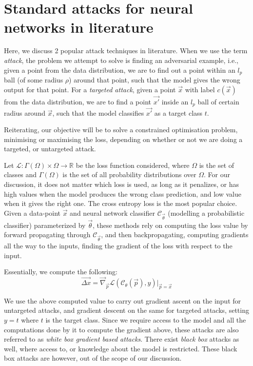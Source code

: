 \documentclass{ociamthesis}
\begin{document}
\section{Standard attacks for neural networks in literature}
\label{section:standard-attacks}

Here, we discuss 2 popular attack techniques in literature. When we use the term
\emph{attack}, the problem we attempt to solve is finding an adversarial
example, i.e., given a point from the data distribution, we are to find out a
point within an $l_p$ ball (of some radius $\rho$) around that point, such that
the model gives the wrong output for that point. For a \emph{targeted attack},
given a point $\vec{x}$ with label $c(\vec{x})$ from the data distribution, we
are to find a point $\vec{x'}$ inside an $l_p$ ball of certain radius around
$\vec{x}$, such that the model classifies $\vec{x'}$ as a target class $t$.

Reiterating, our objective will be to solve a constrained optimisation problem,
minimising or maximising the loss, depending on whether or not we are doing a
targeted, or untargeted attack.

Let $\mathcal{L}: \Gamma(\Omega) \times \Omega \to \mathbb{R}$ be the loss
function considered, where $\Omega$ is the set of classes and $\Gamma(\Omega)$
is the set of all probability distributions over $\Omega$. For our discussion,
it does not matter which loss is used, as long as it penalizes, or has high
values when the model produces the wrong class prediction, and low value when it
gives the right one. The cross entropy loss is the most popular choice. Given a
data-point $\vec{x}$ and neural network classifier $\mathcal{C}_\vec{\theta}$
(modelling a probabilistic classifier) parameterized by $\vec{\theta}$, these
methods rely on computing the loss value by forward propagating through
$\mathcal{C}_\vec{\theta}$, and then backpropagating, computing gradients all
the way to the inputs, finding the gradient of the loss with respect to the
input.

Essentially, we compute the following:
\begin{equation*}
    \vec{\Delta x}
    = \vec{\nabla}_\vec{p} \mathcal{L}(\mathcal{C}_\theta (\vec{p}), y)
    \bigr \rvert_{\vec{p}=\vec{x}}
\end{equation*}

We use the above computed value to carry out gradient ascent on the input for
untargeted attacks, and gradient descent on the same for targeted attacks,
setting $y=t$ where $t$ is the target class. Since we require access to the
model and all the computations done by it to compute the gradient above, these
attacks are also referred to as \emph{white box gradient based attacks}. There
exist \emph{black box} \citep{simba,genattack,prior-conv} attacks as well, where
access to, or knowledge about the model is restricted. These black box attacks
are however, out of the scope of our discussion.
\end{document}
